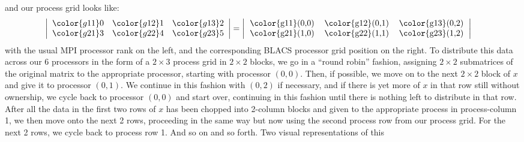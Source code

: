 and our process grid looks like:
\begin{align*}
\left|
      \begin{array}{lll}
      \color{g11}0 & \color{g12}1 & \color{g13}2\\
      \color{g21}3 & \color{g22}4 & \color{g23}5
      \end{array}
\right| &= 
\left|
      \begin{tabular}{lll}
      \color{g11}(0,0) & \color{g12}(0,1) & \color{g13}(0,2)\\
      \color{g21}(1,0) & \color{g22}(1,1) & \color{g23}(1,2)
      \end{tabular}
\right|
\end{align*}
with the usual MPI processor rank on the left, and the corresponding BLACS processor grid position on the right.
\np
To distribute this data across our 6 processors in the form of a $2\times 3$ process grid in $2\times 2$ blocks, we go in a ``round robin'' fashion, assigning $2\times 2$ submatrices of the original matrix to the appropriate processor, starting with processor $(0, 0)$.  Then, if possible, we move on to the next $2\times 2$ block of $x$ and give it to processor $(0, 1)$.  We continue in this fashion with $(0,2)$ if necessary, and if there is yet more of $x$ in that row still without ownership, we cycle back to processor $(0,0)$ and start over, continuing in this fashion until there is nothing left to distribute in that row.
\np
After all the data in the first two rows of $x$ has been chopped into 2-column blocks and given to the appropriate process in process-column 1, we then move onto the next 2 rows, proceeding in the same way but now using the second process row from our process grid.  For the next 2 rows, we cycle back to process row 1.  And so on and so forth.
\np
Two visual representations of this 

